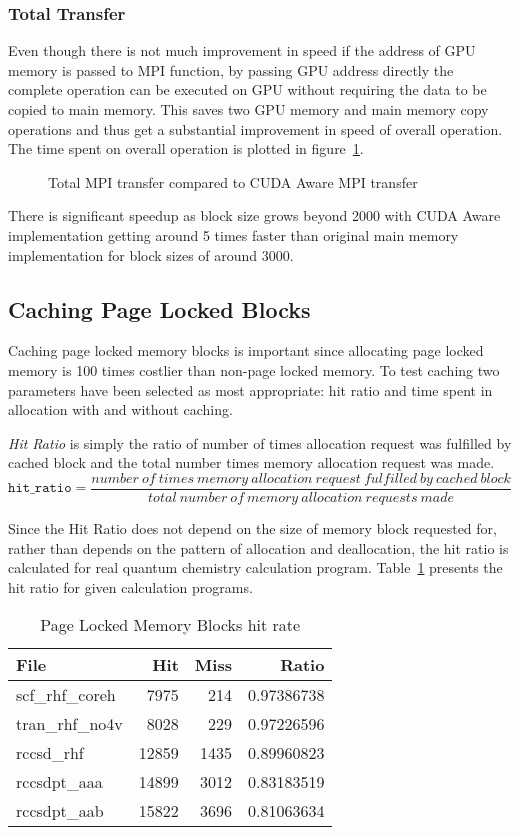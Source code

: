\subsubsection{Total Transfer}
Even though there is not much improvement in speed if the address of GPU memory is
passed to MPI function, by passing GPU address directly the complete operation
can be executed on GPU without requiring the data to be copied to main memory. This
saves two GPU memory and main memory copy operations and thus get a substantial improvement
in speed of overall operation. The time spent on overall operation is plotted in
figure~\ref{fig:mempin_rdma_total}.

\begin{figure}[h]
  
  \caption{Total MPI transfer compared to CUDA Aware MPI transfer}
  \label{fig:mempin_rdma_total}
\end{figure}

There is significant speedup as block size grows beyond 2000 with CUDA Aware
implementation getting around 5 times faster than original main memory implementation
for block sizes of around 3000.

\subsection{Caching Page Locked Blocks}
Caching page locked memory blocks is important since allocating page locked memory
is 100 times costlier than non-page locked memory. To test caching two parameters
have been selected as most appropriate: hit ratio and time spent in allocation with
and without caching.

\textit{Hit Ratio} is simply the ratio of number of times allocation request was
fulfilled by cached block and the total number times memory allocation request
was made.
\[
  \texttt{hit\_ratio} = \frac{number~of~times~memory~allocation~request~fulfilled~by~cached~block}{total~number~of~memory~allocation~requests~made}
\]

Since the Hit Ratio does not depend on the size of memory block requested for, rather
than depends on the pattern of allocation and deallocation, the hit ratio is calculated
for real quantum chemistry calculation program. Table~\ref{tab:mempin_hitrate}
presents the hit ratio for given calculation programs.

\begin{table}[h]
  \centering
  \begin{tabular}{l | r | r | r}
    \hline
    File            & Hit   & Miss & Ratio      \\
    \hline
    scf\_rhf\_coreh &  7975 &  214 & 0.97386738 \\
    tran\_rhf\_no4v &  8028 &  229 & 0.97226596 \\
    rccsd\_rhf      & 12859 & 1435 & 0.89960823 \\
    rccsdpt\_aaa    & 14899 & 3012 & 0.83183519 \\
    rccsdpt\_aab    & 15822 & 3696 & 0.81063634 \\
    \hline
  \end{tabular}
  \caption{Page Locked Memory Blocks hit rate}
  \label{tab:mempin_hitrate}
\end{table}

